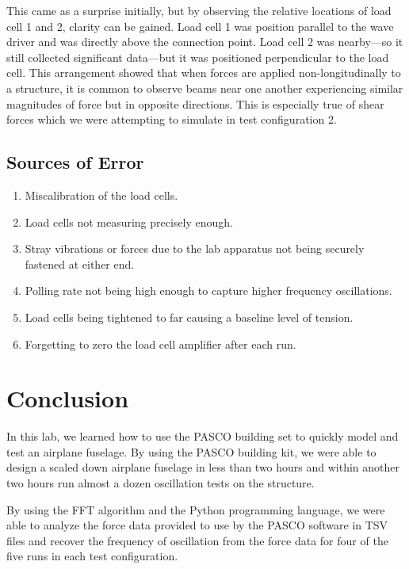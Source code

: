 \documentclass[12 pt]{report}
\begin{document}
This came as a surprise initially, but by observing the relative locations of load cell \num{1} and \num{2}, clarity can be gained. Load cell \num{1} was position parallel to the wave driver and was directly above the connection point. Load cell \num{2} was nearby---so it still collected significant data---but it was positioned perpendicular to the load cell. This arrangement showed that when forces are applied non-longitudinally to a structure, it is common to observe beams near one another experiencing similar magnitudes of force but in opposite directions. This is especially true of shear forces which we were attempting to simulate in test configuration \num{2}.

\subsection{Sources of Error} \label{sources_of_error}
\begin{enumerate}
	\item Miscalibration of the load cells.
	\item Load cells not measuring precisely enough.
	\item Stray vibrations or forces due to the lab apparatus not being securely fastened at either end.
	\item Polling rate not being high enough to capture higher frequency oscillations.
	\item Load cells being tightened to far causing a baseline level of tension.
	\item Forgetting to zero the load cell amplifier after each run.
\end{enumerate}

\section{Conclusion} \label{conclusion-section}
In this lab, we learned how to use the PASCO building set to quickly model and test an airplane fuselage. By using the PASCO building kit, we were able to design a scaled down airplane fuselage in less than two hours and within another two hours run almost a dozen oscillation tests on the structure.

By using the FFT algorithm and the Python programming language, we were able to analyze the force data provided to use by the PASCO software in TSV files and recover the frequency of oscillation from the force data for four of the five runs in each test configuration.
\end{document}
